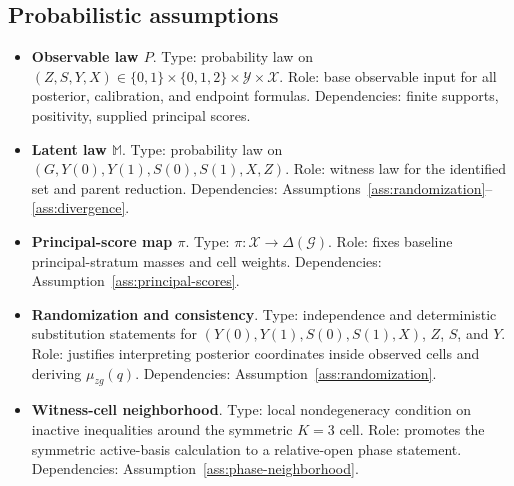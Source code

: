 \documentclass[11pt]{article}
\theoremstyle{definition}
\theoremstyle{plain}
\theoremstyle{remark}
\begin{document}
\subsection*{Probabilistic assumptions}
\begin{itemize}[leftmargin=2em]
  \item \textbf{Observable law \(P\)}.  Type: probability law on \((Z,S,Y,X)\in\{0,1\}\times\{0,1,2\}\times\mathcal Y\times\mathcal X\).  Role: base observable input for all posterior, calibration, and endpoint formulas.  Dependencies: finite supports, positivity, supplied principal scores.
  \item \textbf{Latent law \(\mathbb M\)}.  Type: probability law on \((G,Y(0),Y(1),S(0),S(1),X,Z)\).  Role: witness law for the identified set and parent reduction.  Dependencies: Assumptions~\ref{ass:randomization}--\ref{ass:divergence}.
  \item \textbf{Principal-score map \(\pi\)}.  Type: \(\pi:\mathcal X\to\Delta(\mathcal G)\).  Role: fixes baseline principal-stratum masses and cell weights.  Dependencies: Assumption~\ref{ass:principal-scores}.
  \item \textbf{Randomization and consistency}.  Type: independence and deterministic substitution statements for \((Y(0),Y(1),S(0),S(1),X)\), \(Z\), \(S\), and \(Y\).  Role: justifies interpreting posterior coordinates inside observed cells and deriving \(\mu_{zg}(q)\).  Dependencies: Assumption~\ref{ass:randomization}.
  \item \textbf{Witness-cell neighborhood}.  Type: local nondegeneracy condition on inactive inequalities around the symmetric \(K=3\) cell.  Role: promotes the symmetric active-basis calculation to a relative-open phase statement.  Dependencies: Assumption~\ref{ass:phase-neighborhood}.
\end{itemize}
\end{document}
